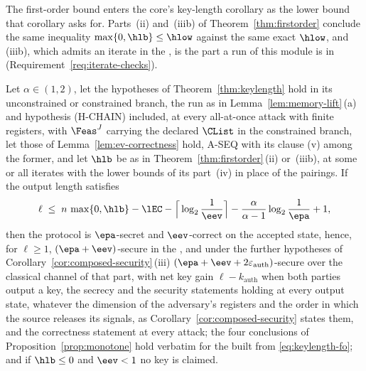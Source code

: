 
The first-order bound enters the core's key-length corollary as the lower
bound that corollary asks for. Parts~(ii) and~(iiib) of
Theorem~\ref{thm:firstorder} conclude the same inequality
$\max\{0,\hlb\}\le\hlow$ against the same exact $\hlow$, and (iiib), which
admits an iterate in the , is the part a run of
this module is in (Requirement~\ref{req:iterate-checks}).

\begin{corollary}\label{cor:fo-keylength}
Let $\alpha\in(1,2)$, let the hypotheses of Theorem~\ref{thm:keylength}
hold in its unconstrained or constrained branch, the run as in
Lemma~\ref{lem:memory-lift}\,(a) and hypothesis (H-CHAIN) included, at every
all-at-once attack with finite registers, with $\Feas^{J}$ carrying
the declared $\CList$ in the constrained branch, let those of
Lemma~\ref{lem:ev-correctness} hold, A-SEQ with its clause (v) among the
former, and let $\hlb$ be as in
Theorem~\ref{thm:firstorder}\,(ii) or~(iiib), at some or all iterates
with the lower bounds of its part~(iv) in place of the pairings. If the
output length
satisfies
\begin{equation}\label{eq:keylength-fo}
  \ell\;\le\;n\,\max\{0,\hlb\}-\lEC-\Big\lceil\log_2\frac1{\eev}\Big\rceil
  -\frac{\alpha}{\alpha-1}\log_2\frac1{\epa}+1,
\end{equation}
then the protocol is $\epa$-secret and $\eev$-correct on the accepted
state, hence, for $\ell\ge1$, $(\epa+\eev)$-secure in the
, and under the further hypotheses of
Corollary~\ref{cor:composed-security}\,(iii)
$(\epa+\eev+2\varepsilon_{\mathrm{auth}})$-secure over the classical channel
of that part, with net key gain $\ell-k_{\mathrm{auth}}$ when both parties
output a key, the secrecy and the security statements holding at every
output state, whatever the dimension of the adversary's registers and the
order in which the source releases its signals, as
Corollary~\ref{cor:composed-security} states them, and the correctness
statement at every attack; the four conclusions of
Proposition~\ref{prop:monotone} hold verbatim for the
 built from \eqref{eq:keylength-fo}; and if
$\hlb\le0$ and $\eev<1$ no key is claimed.
\end{corollary}

